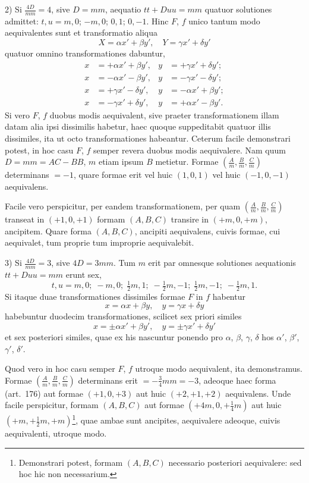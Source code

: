 \documentclass[12pt,a4paper]{article}
\theoremstyle{plain}
\begin{document}
2) Si $\frac{4D}{mm} = 4$, sive $D = mm$, aequatio $tt + Duu = mm$ quatuor solutiones admittet: $t,u = m,0$; $-m,0$; $0,1$; $0,-1$. Hinc $F$, $f$ unico tantum modo aequivalentes sunt et transformatio aliqua
\[
X = \alpha x' + \beta y', \quad Y = \gamma x' + \delta y'
\]
quatuor omnino transformationes dabuntur,
\[
\begin{aligned}
x &= +\alpha x' + \beta y', & y &= +\gamma x' + \delta y';\\
x &= -\alpha x' - \beta y', & y &= -\gamma x' - \delta y';\\
x &= +\gamma x' - \delta y', & y &= -\alpha x' + \beta y';\\
x &= -\gamma x' + \delta y', & y &= +\alpha x' - \beta y'.
\end{aligned}
\]
Si vero $F$, $f$ duobus modis aequivalent, sive praeter transformationem illam datam alia ipsi dissimilis habetur, haec quoque suppeditabit quatuor illis dissimiles, ita ut octo transformationes habeantur. Ceterum facile demonstrari potest, in hoc casu $F$, $f$ semper revera duobus modis aequivalere. Nam quum $D = mm = AC - BB$, $m$ etiam ipsum $B$ metietur. Formae $(\frac{A}{m}, \frac{B}{m}, \frac{C}{m})$ determinans $= -1$, quare formae erit vel huic $(1,0,1)$ vel huic $(-1,0,-1)$ aequivalens.

Facile vero perspicitur, per eandem transformationem, per quam $(\frac{A}{m}, \frac{B}{m}, \frac{C}{m})$ transeat in $(+1,0,+1)$ formam $(A,B,C)$ transire in $(+m,0,+m)$, ancipitem. Quare forma $(A,B,C)$, ancipiti aequivalens, cuivis formae, cui aequivalet, tum proprie tum improprie aequivalebit.

3) Si $\frac{4D}{mm} = 3$, sive $4D = 3mm$. Tum $m$ erit par omnesque solutiones aequationis $tt + Duu = mm$ erunt sex,
\[
t,u = m,0; \; -m,0; \; \tfrac{1}{2}m, 1; \; -\tfrac{1}{2}m, -1; \; \tfrac{1}{2}m, -1; \; -\tfrac{1}{2}m, 1.
\]
Si itaque duae transformationes dissimiles formae $F$ in $f$ habentur
\[
x = \alpha x + \beta y, \quad y = \gamma x + \delta y
\]
habebuntur duodecim transformationes, scilicet sex priori similes
\[
x = \pm \alpha x' + \beta y', \quad y = \pm \gamma x' + \delta y'
\]
et sex posteriori similes, quae ex his nascuntur ponendo pro $\alpha$, $\beta$, $\gamma$, $\delta$ hos $\alpha'$, $\beta'$, $\gamma'$, $\delta'$.

Quod vero in hoc casu semper $F$, $f$ utroque modo aequivalent, ita demonstramus. Formae $(\frac{A}{m}, \frac{B}{m}, \frac{C}{m})$ determinans erit $= -\frac{3}{4}mm = -3$, adeoque haec forma (art.~176) aut formae $(+1,0,+3)$ aut huic $(+2,+1,+2)$ aequivalens. Unde facile perspicitur, formam $(A,B,C)$ aut formae $(+4m, 0, +\frac{1}{4}m)$ aut huic $(+m, +\frac{1}{2}m, +m)$\footnote{Demonstrari potest, formam $(A,B,C)$ necessario posteriori aequivalere: sed hoc hic non necessarium.}, quae ambae sunt ancipites, aequivalere adeoque, cuivis aequivalenti, utroque modo.
\end{document}
